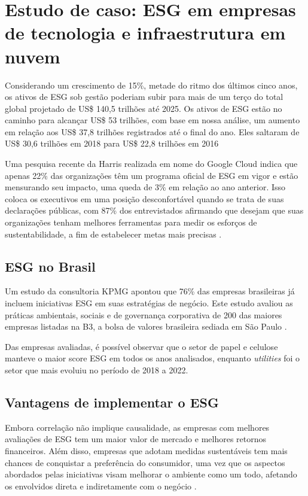 \documentclass[12pt]{article}
\begin{document}
	\section*{Estudo de caso: ESG em empresas de tecnologia e infraestrutura em nuvem}
	
	Considerando um crescimento de 15\%, metade do ritmo dos últimos cinco anos, os ativos de ESG sob gestão poderiam subir para mais de um terço do total global projetado de US\$ 140,5 trilhões até 2025. Os ativos de ESG estão no caminho para alcançar US\$ 53 trilhões, com base em nossa análise, um aumento em relação aos US\$ 37,8 trilhões registrados até o final do ano. Eles saltaram de US\$ 30,6 trilhões em 2018 para US\$ 22,8 trilhões em 2016 \cite{bloombergprofessionalservicesESGAssetsMay2021}
	
	Uma pesquisa recente da Harris realizada em nome do Google Cloud indica que apenas 22\% das organizações têm um programa oficial de ESG em vigor e estão mensurando seu impacto, uma queda de 3\% em relação ao ano anterior. Isso coloca os executivos em uma posição desconfortável quando se trata de suas declarações públicas, com 87\% dos entrevistados afirmando que desejam que suas organizações tenham melhores ferramentas para medir os esforços de sustentabilidade, a fim de estabelecer metas mais precisas \cite{googlecloudUnderstandingHowYour2023}.
	
	
	\subsection*{ESG no Brasil}
	
	Um estudo da consultoria KPMG apontou que 76\% das empresas brasileiras já incluem iniciativas ESG em suas estratégias de negócio. Este estudo avaliou as práticas ambientais, sociais e de governança corporativa de 200 das maiores empresas listadas na B3, a bolsa de valores brasileira sediada em São Paulo \cite{deKPMGESGYearbook2023}.
	
	Das empresas avaliadas, é possível observar que o setor de papel e celulose manteve o maior score ESG em todos os anos analisados, enquanto \emph{utilities} foi o setor que mais evoluiu no período de 2018 a 2022.
	
	\subsection*{Vantagens de implementar o ESG}
	
	Embora correlação não implique causalidade, as empresas com melhores avaliações de ESG tem um maior valor de mercado e melhores retornos financeiros. Além disso, empresas que adotam medidas sustentáveis tem mais chances de conquistar a preferência do consumidor, uma vez que os aspectos abordados pelas iniciativas visam melhorar o ambiente como um todo, afetando os envolvidos direta e indiretamente com o negócio \cite{cabralPraticasESGAplicadas2023}.
	
\end{document}

